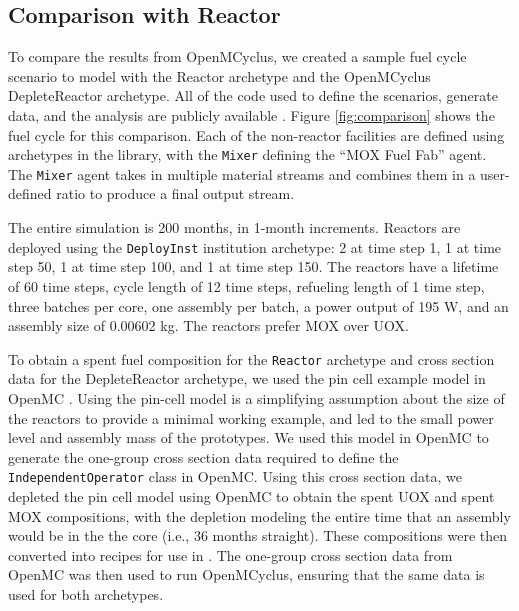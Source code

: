 \subsection{Comparison with \Cycamore Reactor}\label{sec:benchmark}
To compare the results from OpenMCyclus, we created a sample fuel cycle 
scenario to model with the \Cycamore Reactor archetype and the 
OpenMCyclus DepleteReactor archetype. All of the code used to define the 
scenarios, generate data, and the analysis are publicly available 
\cite{bachmann_openmcyclus_2023}. Figure \ref{fig:comparison} 
shows the fuel cycle for this comparison. Each of the non-reactor 
facilities are defined 
using archetypes in the \Cycamore library, with the \Cycamore \texttt{Mixer}
defining the ``MOX Fuel Fab'' agent. The \texttt{Mixer} agent takes in multiple 
material streams and combines them in a user-defined ratio to produce 
a final output stream. 



The entire simulation is 200 months, in 1-month increments. Reactors are 
deployed using the 
\Cycamore \texttt{DeployInst} institution archetype: 2 at time step 1, 
1 at time step 
50, 1 at time step 100, and 1 at time step 150. The reactors have a lifetime 
of 60 time steps, cycle length of 12 time steps, refueling length of 1 
time step, three batches per core, one assembly per batch, a power output of 
195 W, and an assembly size of 0.00602 kg. The reactors prefer MOX over UOX. 
 
To obtain a spent fuel composition for the \Cycamore \texttt{Reactor} 
archetype and cross section data for the DepleteReactor archetype, we 
used the pin cell example model in OpenMC \cite{noauthor_modeling_nodate}. 
Using the pin-cell model is a simplifying assumption about the size of 
the reactors to provide a minimal working example, 
and led to the small power level and assembly mass of the prototypes. 
We used this model in OpenMC to generate the one-group cross 
section data required to define 
the \texttt{IndependentOperator} class 
in OpenMC. Using this cross section data, we depleted the pin cell 
model using OpenMC to obtain the spent UOX and 
spent MOX compositions, with the depletion modeling the entire time that 
an assembly would be in the the core (i.e., 36 months straight). 
These compositions were then converted into recipes for use in 
\Cyclus.
The one-group cross section data from OpenMC was then used to run 
OpenMCyclus, ensuring that the same data is used for both archetypes.  

